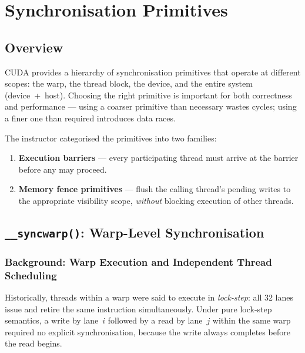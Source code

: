 \newpage
\section{Synchronisation Primitives}
\label{sec:sync-primitives}

\subsection{Overview}

CUDA provides a hierarchy of synchronisation primitives that operate at
different scopes: the warp, the thread block, the device, and the entire
system (device~+~host). Choosing the right primitive is important for both
correctness and performance --- using a coarser primitive than necessary wastes
cycles; using a finer one than required introduces data races.

The instructor categorised the primitives into two families:

\begin{enumerate}[noitemsep]
  \item \textbf{Execution barriers} --- every participating thread must arrive
        at the barrier before any may proceed.
  \item \textbf{Memory fence primitives} --- flush the calling thread's pending
        writes to the appropriate visibility scope, \emph{without} blocking
        execution of other threads.
\end{enumerate}

\subsection{\texttt{\_\_syncwarp()}: Warp-Level Synchronisation}
\label{subsec:syncwarp}

\subsubsection{Background: Warp Execution and Independent Thread Scheduling}

Historically, threads within a warp were said to execute in \emph{lock-step}:
all 32 lanes issue and retire the same instruction simultaneously. Under pure
lock-step semantics, a write by lane~$i$ followed by a read by lane~$j$ within
the same warp required no explicit synchronisation, because the write always
completes before the read begins.


